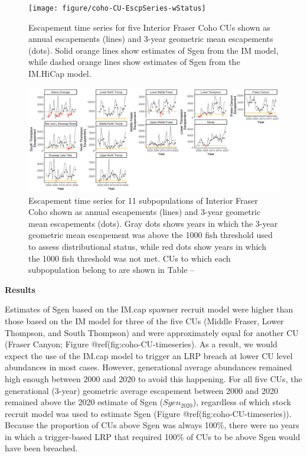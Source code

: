 \documentclass[
]{article}
\begin{document}
\begin{figure}

{\centering \texttt{[image: figure/coho-CU-EscpSeries-wStatus]} 

}

\caption{Escapement time series for five Interior Fraser Coho CUs shown as annual escapements (lines) and 3-year geometric mean escapements (dots). Solid orange lines show estimates of Sgen from the IM model, while dashed orange lines show estimates of Sgen from the IM.HiCap model.}\label{fig:coho-CU-timeseries}
\end{figure}

\begin{figure}

{\centering \includegraphics[width=41.67in]{figure/coho-Subpop-EscpSeries-wStatus} 

}

\caption{Escapement time series for 11 subpopulations of Interior Fraser Coho shown as annual escapements (lines) and 3-year geometric mean escapements (dots). Gray dots shows years in which the 3-year geometric mean escapement was above the 1000 fish threshold used to assess distributional status, while red dots show years in which the 1000 fish threshold was not met.  CUs to which each subpopulation belong to are shown in Table --}\label{fig:coho-Subpop-timeseries}
\end{figure}

\linebreak

\textbf{Results}

Estimates of Sgen based on the IM.cap spawner recruit model were higher
than those based on the IM model for three of the five CUs (Middle
Fraser, Lower Thompson, and South Thompson) and were approximately equal
for another CU (Fraser Canyon; Figure @ref(fig:coho-CU-timeseries). As a
result, we would expect the use of the IM.cap model to trigger an LRP
breach at lower CU level abundances in most cases. However, generational
average abundances remained high enough between 2000 and 2020 to avoid
this happening. For all five CUs, the generational (3-year) geometric
average escapement between 2000 and 2020 remained above the 2020
estimate of Sgen (\(Sgen_{2020}\)), regardless of which stock recruit
model was used to estimate Sgen (Figure @ref(fig:coho-CU-timeseries)).
Because the proportion of CUs above Sgen was always 100\%, there were no
years in which a trigger-based LRP that required 100\% of CUs to be
above Sgen would have been breached.
\end{document}
